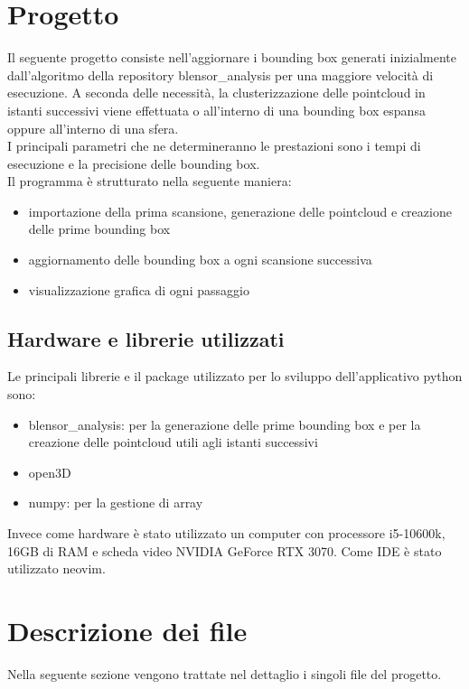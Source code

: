 \documentclass[italian]{article}
\begin{document}
\section*{Progetto}
Il seguente progetto consiste nell'aggiornare i bounding box generati inizialmente dall'algoritmo della repository blensor\_analysis per una maggiore velocità di esecuzione. A seconda delle necessità, la clusterizzazione delle pointcloud in istanti successivi viene effettuata o all'interno di una bounding box espansa oppure all'interno di una sfera.\\
I principali parametri che ne determineranno le prestazioni sono i tempi di esecuzione e la precisione delle bounding box.\\ %
Il programma è strutturato nella seguente maniera:
\begin{itemize}
	\item importazione della prima scansione, generazione delle pointcloud e creazione delle prime bounding box
	\item aggiornamento delle bounding box a ogni scansione successiva
	\item visualizzazione grafica di ogni passaggio
\end{itemize}
\subsection{Hardware e librerie utilizzati}
Le principali librerie e il package utilizzato per lo sviluppo dell'applicativo python sono:
\begin{itemize}
	\item blensor\_analysis: per la generazione delle prime bounding box e per la creazione delle pointcloud utili agli istanti successivi
	\item open3D
	\item numpy: per la gestione di array
\end{itemize}
Invece come hardware è stato utilizzato un computer con processore i5-10600k, 16GB di RAM e scheda video NVIDIA GeForce RTX 3070. Come IDE è stato utilizzato neovim.


\section{Descrizione dei file}
Nella seguente sezione vengono trattate nel dettaglio i singoli file del progetto.
\end{document}
